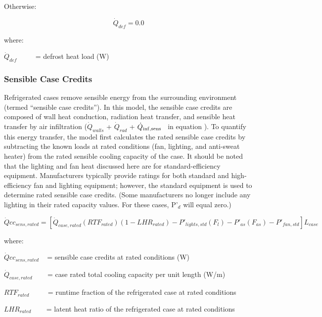 Otherwise:

\begin{equation}  
  \dot{Q}_{def} = 0.0
\end{equation}

where:

\({\dot Q_{def}}\) ~~~~ = defrost heat load (W)

\subsubsection{Sensible Case Credits}\label{sensible-case-credits}

Refrigerated cases remove sensible energy from the surrounding environment (termed ``sensible case credits''). In this model, the sensible case credits are composed of wall heat conduction, radiation heat transfer, and sensible heat transfer by air infiltration (\({\dot Q_{walls}}\) + \({\dot Q_{rad}}\) + \({\dot Q_{{\rm{inf,sens}}}}\) ~in equation ). To quantify this energy transfer, the model first calculates the rated sensible case credits by subtracting the known loads at rated conditions (fan, lighting, and anti-sweat heater) from the rated sensible cooling capacity of the case. It should be noted that the lighting and fan heat discussed here are for standard-efficiency equipment. Manufacturers typically provide ratings for both standard and high-efficiency fan and lighting equipment; however, the standard equipment is used to determine rated sensible case credits. (Some manufacturers no longer include any lighting in their rated capacity values. For these cases, P'\(_{d}\) will equal zero.)

\begin{equation}
\dot Qc{c_{sens,rated}} = \left[ {{{\dot Q}_{case,rated}}\left( {RT{F_{rated}}} \right)\left( {1 - LH{R_{rated}}} \right) - {P'}_{lights,std}\left( {{F_l}} \right) - {P'}_{as}\left( {{F_{as}}} \right) - {P'}_{fan,std}} \right]{L_{case}}
\end{equation}

where:

\(\dot Qc{c_{sens,rated}}\) ~ = sensible case credits at rated conditions (W)

\({\dot Q_{case,rated}}\) ~~~ = case rated total cooling capacity per unit length (W/m)

\(RT{F_{rated}}\) ~~~~ = runtime fraction of the refrigerated case at rated conditions

\(LH{R_{rated}}\) ~~~ = latent heat ratio of the refrigerated case at rated conditions

